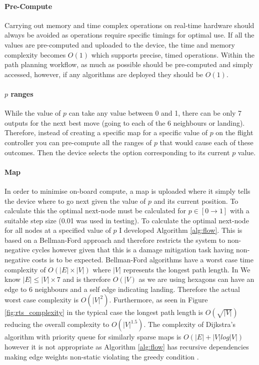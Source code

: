 \paragraph{Pre-Compute}
Carrying out memory and time complex operations on real-time hardware should always be avoided as operations require specific timings for optimal use. If all the values are pre-computed and uploaded to the device, the time and memory complexity becomes $O(1)$ which supports precise, timed operations. Within the path planning workflow, as much as possible should be pre-computed and simply accessed, however, if any algorithms are deployed they should be $O(1)$.
\paragraph{$p$ ranges}
While the value of $p$ can take any value between 0 and 1, there can be only 7 outputs for the next best move (going to each of the 6 neighbours or landing). Therefore, instead of creating a specific map for a specific value of $p$ on the flight controller you can pre-compute all the ranges of $p$ that would cause each of these outcomes. Then the device selects the option corresponding to its current $p$ value.
\paragraph{Map}

In order to minimise on-board compute, a map is uploaded where it simply tells the device where to go next given the value of $p$ and its current position. To calculate this the optimal next-node must be calculated for $p\in[0\to1]$ with a suitable step size (0.01 was used in testing).  To calculate the optimal next-node for all nodes at a specified value of $p$ I developed Algorithm \ref{alg:flow}. This is based on a Bellman-Ford \cite{bellman1958}\cite{ford1956} approach and therefore restricts the system to non-negative cycles however given that this is a damage mitigation task having non-negative costs is to be expected.  Bellman-Ford algorithms have a worst case time complexity of $O(|E|\times |V|)$ where $|V|$ represents the longest path length. In We know $|E| \leq |V| \times 7$ and is therefore $O(|V)$ as we are using hexagons can have an edge to 6 neighbours and a self edge indicating landing. Therefore the actual worst case complexity is $O(|V|^2)$\cite{cormen2009}.  Furthermore, as seen in Figure \ref{fig:rts_complexity} in the typical case the longest path length is $O(\sqrt{|V|})$ reducing the overall complexity to $O(|V|^{1.5})$. The complexity of Dijkstra's algorithm \cite{dijkstra1959} with priority queue for similarly sparse maps is $O(|E| + |V|log|V|)$ however it is not appropriate as Algorithm \ref{alg:flow} has recursive dependencies making edge weights non-static violating the greedy condition \cite{cormen2009}.

